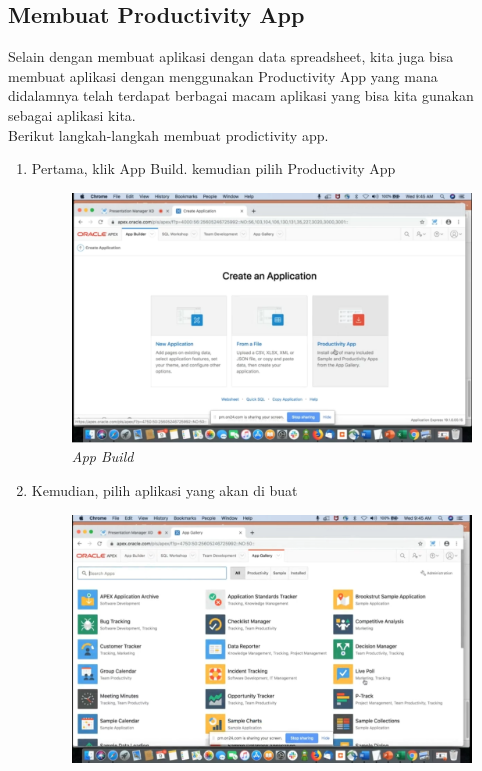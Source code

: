 \subsection{Membuat Productivity App}
Selain dengan membuat aplikasi dengan data spreadsheet, kita juga bisa membuat aplikasi dengan menggunakan Productivity App yang mana didalamnya telah terdapat berbagai macam aplikasi yang bisa kita gunakan sebagai aplikasi kita.\\
Berikut langkah-langkah membuat prodictivity app.
\begin{enumerate}
 \item Pertama, klik App Build. kemudian pilih Productivity App
 \begin{figure}[H]
    \centering
    \includegraphics[scale=0.5]{figures/a}
    \caption{\textit{App Build}}
    \label{foto1}
\end{figure}
 \item Kemudian, pilih aplikasi yang akan di buat
 \begin{figure}[H]
    \centering
    \includegraphics[scale=0.5]{figures/b}

\end{figure}
\end{enumerate}

